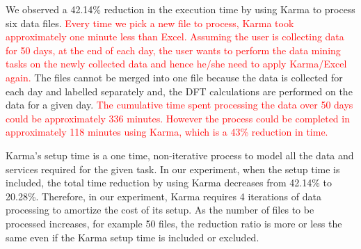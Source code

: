 

We observed a 42.14\% reduction in the execution time by using Karma to process six data files. \textcolor{red}{Every time we pick a new file to process, Karma took approximately one minute less than Excel. Assuming the user is collecting data for 50 days, at the end of each day, the user wants to perform the data mining tasks on the newly collected data and hence he/she need to apply Karma/Excel again.} The files cannot be merged into one file because the data is collected for each day and labelled separately and, the DFT calculations are performed on the data for a given day. \textcolor{red}{The cumulative time spent processing the data over 50 days could be approximately 336 minutes. However the process could be completed in approximately 118 minutes using Karma, which is a 43\% reduction in time.}


Karma's setup time is a one time, non-iterative process to model all the data and services required for the given task. In our experiment, when the setup time is included, the total time reduction by using Karma decreases from 42.14\% to 20.28\%. Therefore, in our experiment, Karma requires 4 iterations of data processing to amortize the cost of its setup. As the number of files to be processed increases, for example 50 files, the reduction ratio is more or less the same even if the Karma setup time is included or excluded. 

